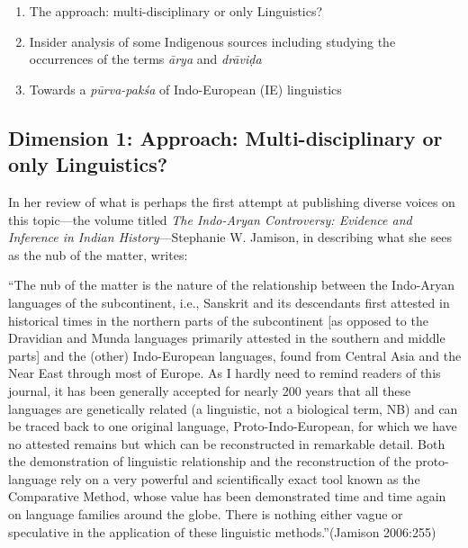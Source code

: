 \begin{enumerate}
\itemsep=0pt
\item The approach: multi-disciplinary or only Linguistics?

 \item Insider analysis of some Indigenous sources including studying the occurrences of the terms \textit{ārya} and \textit{drāviḍa}

 \item Towards a \textit{pūrva-pakśa} of Indo-European (IE) linguistics

\end{enumerate}


\subsection{Dimension 1: Approach: Multi-disciplinary or only Linguistics?}

In her review of what is perhaps the first attempt at publishing diverse voices on this topic—the volume titled \textit{The Indo-Aryan Controversy: Evidence and Inference in Indian History}—Stephanie W. Jamison, in describing what she sees as the nub of the matter, writes:

\begin{myquote}
“The nub of the matter is the nature of the relationship between the Indo-Aryan languages of the subcontinent, i.e., Sanskrit and its descendants first attested in historical times in the northern parts of the subcontinent [as opposed to the Dravidian and Munda languages primarily attested in the southern and middle parts] and the (other) Indo-European languages, found from Central Asia and the Near East through most of Europe. As I hardly need to remind readers of this journal, it has been generally accepted for nearly 200 years that all these languages are genetically related (a linguistic, not a biological term, NB) and can be traced back to one original language, Proto-Indo-European, for which we have no attested remains but which can be reconstructed in remarkable detail. Both the demonstration of linguistic relationship and the reconstruction of the proto-language rely on a very powerful and scientifically exact tool known as the Comparative Method, whose value has been demonstrated time and time again on language families around the globe. There is nothing either vague or speculative in the application of these linguistic methods.”\hfill (Jamison 2006:255)
\end{myquote}

